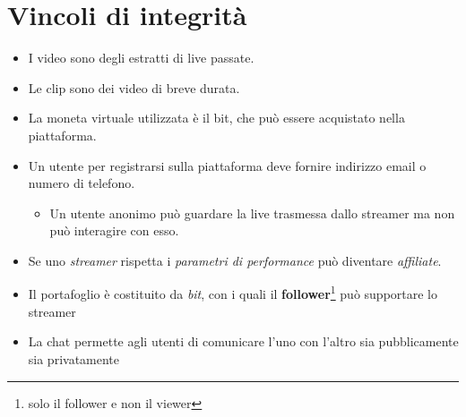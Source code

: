 \section{Vincoli di integrità}
\begin{itemize}
    \item I video sono degli estratti di live passate.
    \item Le clip sono dei video di breve durata.
    \item La moneta virtuale utilizzata è il bit, che può essere acquistato nella piattaforma.
    \item Un utente per registrarsi sulla piattaforma deve fornire indirizzo email o numero di telefono.
    \begin{itemize}
        \item Un utente anonimo può guardare la live trasmessa dallo streamer ma non può interagire con esso. 
    \end{itemize}
        \item Se uno \textit{streamer} rispetta i \textit{parametri di performance} può diventare \textit{affiliate}.
        \item Il portafoglio è costituito da \textit{bit}, con i quali il \textbf{follower}\footnote{solo il follower e non il viewer} può supportare lo streamer
        \item La chat permette agli utenti di comunicare l'uno con l'altro sia pubblicamente sia privatamente
\end{itemize}